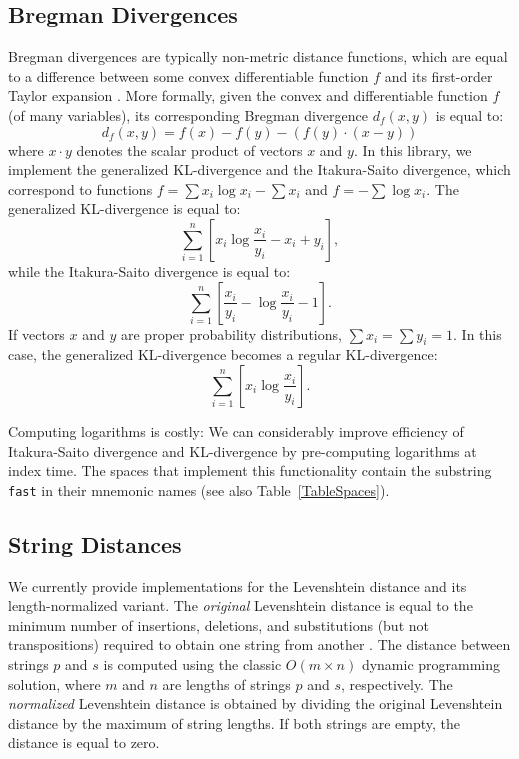 \documentclass[runningheads,a4paper]{llncs}
\newcommand{\ttt}[1]{\texttt{#1}}
\begin{document}
{\subsection{Bregman Divergences}\label{SectionBregman}
Bregman divergences are typically non-metric distance functions,
which are equal to a difference between some convex differentiable function $f$
and its first-order Taylor expansion \cite{Bregman:1967,Cayton2008}. 
More formally, given the convex and differentiable function $f$
(of many variables), its
corresponding Bregman divergence $d_f(x,y)$ is equal to:
$$
d_f(x,y) = f(x) - f(y) - \left( f(y) \cdot ( x - y ) \right)
$$
where $ x \cdot y$ denotes the scalar product of vectors $x$ and $y$.
In this library, we implement the generalized KL-divergence 
and the Itakura-Saito divergence,
which correspond to functions $f=\sum x_i \log x_i - \sum x_i$ and $f = - \sum \log x_i$. 
The generalized KL-divergence is equal to:
$$
\sum_{i=1}^n \left[  x_i \log \frac{x_i}{y_i} -   x_i +   y_i \right],
$$
while the Itakura-Saito divergence is equal to:
$$ 
\sum_{i=1}^n \left[ \frac{ x_i}{y_i} - \log \frac{x_i}{y_i}  -1 \right].
$$
If vectors $x$ and $y$ are proper probability distributions, $\sum x_i = \sum y_i = 1$.
In this case, the generalized KL-divergence becomes a regular KL-divergence:
$$
\sum_{i=1}^n \left[  x_i \log \frac{x_i}{y_i} \right].
$$

Computing logarithms is costly: We can considerably improve efficiency of 
Itakura-Saito divergence and KL-divergence by pre-computing logarithms at index time.
The spaces that implement this functionality contain the substring \ttt{fast} in their mnemonic names (see also Table~\ref{TableSpaces}).

\subsection{String Distances}\label{SectionEditDistance}
We currently provide implementations for the Levenshtein distance and its length-normalized variant.
The \emph{original} Levenshtein distance is equal to the minimum number of insertions, deletions, and
substitutions (but not transpositions) required to obtain one string from another \cite{Levenshtein:1966}.
The distance between strings $p$ and $s$ is computed using the classic $O(m \times n)$
dynamic programming solution, where $m$ and $n$ are lengths of strings $p$ and $s$, respectively. 
The \emph{normalized} Levenshtein distance is obtained by dividing the original Levenshtein distance by
the maximum of string lengths. If both strings are empty, the distance is equal to zero.

}
\end{document}
